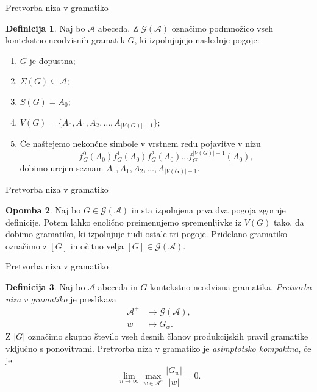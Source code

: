 \documentclass{beamer}
\newcommand{\G}{\mathcal{G}}
\newcommand{\A}{\mathcal{A}}
\theoremstyle{definition}
\newtheorem{definicija}{Definicija}[section]
\newtheorem{opomba}[definicija]{Opomba}
\begin{document}
\begin{frame}{Pretvorba niza v gramatiko}
    \begin{definicija}
        Naj bo $\A$ abeceda. Z $ \G(\A) $ označimo podmnožico vseh kontekstno neodvisnih gramatik
        $G$, ki izpolnjujejo naslednje pogoje:
        \begin{enumerate}
            \item<1-> $G$ je dopustna;
            \item<2-> $ \Sigma(G) \subseteq \A $;
            \item<3->$ S(G) = A_0 $;
            \item<4-> $ V(G) = \{ A_0, A_1, A_2, \ldots, A_{|V(G)| - 1} \} $;
            \item<5-> Če naštejemo nekončne simbole v vrstnem redu pojavitve v nizu
            \[
            f_G^0(A_0) f_G^1(A_0) f_G^2(A_0) \dots f_G^{|V(G)| - 1}(A_0),
            \]
            dobimo urejen seznam $ A_0, A_1, A_2, \ldots, A_{|V(G)| - 1} $.
        \end{enumerate}
    \end{definicija}
\end{frame}

\begin{frame}{Pretvorba niza v gramatiko}
    \begin{opomba}
         Naj bo $ G \in \G(\A) $ in sta izpolnjena prva dva pogoja zgornje definicije.
         Potem lahko enolično preimenujemo spremenljivke iz $ V(G) $ tako, da dobimo gramatiko, ki izpolnjuje tudi ostale tri pogoje. Pridelano gramatiko označimo z $[G]$ in očitno velja $ [G] \in \G(\A) $.
    \end{opomba}
\end{frame}

\begin{frame}{Pretvorba niza v gramatiko}
    \begin{definicija}
        Naj bo $\A$ abeceda in $G$ kontekstno-neodvisna gramatika. 
        \textit{Pretvorba niza v gramatiko} je preslikava
        \begin{align*}
            \A^+ &\rightarrow \G(\A), \\
            w &\mapsto G_w.
        \end{align*}
        \pause
        Z $|G|$ označimo skupno število vseh desnih članov produkcijskih pravil gramatike vključno s ponovitvami. Pretvorba niza v gramatiko je \textit{asimptotsko kompaktna}, če je
        \[
            \lim_{n \rightarrow \infty} \max_{w \in \A^n} \frac{|G_w|}{|w|} = 0.
        \]
    \end{definicija}
\end{frame}
\end{document}
